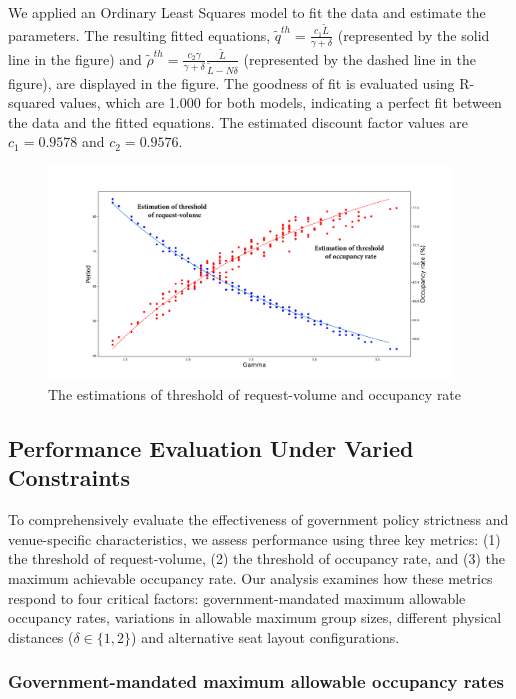 We applied an Ordinary Least Squares model to fit the data and estimate the parameters. The resulting fitted equations, $\tilde{q}^{th} = \frac{c_1 \tilde{L}}{\gamma + \delta}$ (represented by the solid line in the figure) and $\tilde{\rho}^{th} = \frac{c_2 \gamma}{\gamma + \delta} \frac{\tilde{L}}{\tilde{L}-N \delta}$ (represented by the dashed line in the figure), are displayed in the figure. The goodness of fit is evaluated using R-squared values, which are 1.000 for both models, indicating a perfect fit between the data and the fitted equations. The estimated discount factor values are $c_1 = 0.9578$ and $c_2 = 0.9576$.

\begin{figure}[ht]
  \caption{The estimations of threshold of request-volume and occupancy rate}
  \centering
    \includegraphics[width=0.95\textwidth]{./Figures/200_random.pdf}
\end{figure}

\subsection{Performance Evaluation Under Varied Constraints}\label{perf_constraints}
To comprehensively evaluate the effectiveness of government policy strictness and venue-specific characteristics, we assess performance using three key metrics: (1) the threshold of request-volume, (2) the threshold of occupancy rate, and (3) the maximum achievable occupancy rate. Our analysis examines how these metrics respond to four critical factors: government-mandated maximum allowable occupancy rates, variations in allowable maximum group sizes, different physical distances ($\delta \in \{1,2\}$) and alternative seat layout configurations.


\subsubsection{Government-mandated maximum allowable occupancy rates}

